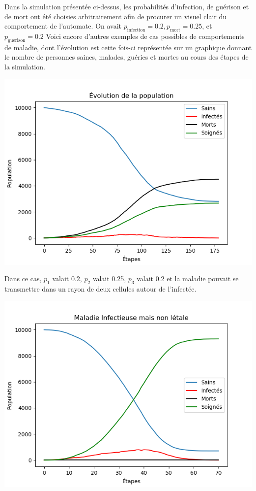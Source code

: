 \documentclass{article}
\begin{document}
Dans la simulation présentée ci-dessus, les probabilités d'infection, de guérison et de mort ont été choisies arbitrairement afin de procurer un visuel clair du comportement de l'automate. On  avait $p_{\text{infection}} = 0.2, p_{\text{mort}} = 0.25$, et $p_{\text{guerison}} = 0.2$ Voici encore d'autres exemples de cas possibles de comportements de maladie, dont l'évolution est cette fois-ci représentée sur un graphique donnant le nombre de personnes saines, malades, guéries et mortes au cours des étapes de la simulation.



\includegraphics[scale=1]{../images/g.png} 


	Dans ce cas, $p_1$ valait 0.2, $p_2$ valait 0.25, $p_3$ valait 0.2 et la maladie pouvait se transmettre dans un rayon de deux cellules autour de l'infectée.

\includegraphics[scale=1]{../images/Figure_2.png}
\end{document}
